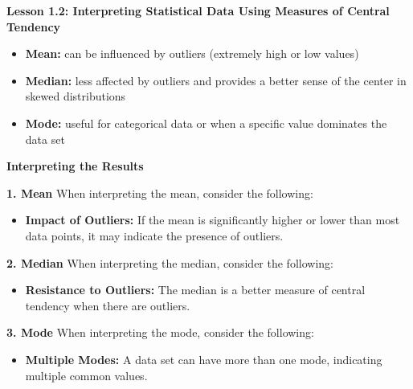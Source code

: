 \begin{center}
\textbf{Lesson 1.2: Interpreting Statistical Data Using Measures of Central Tendency}
\end{center}

\vspace*{1ex}

\begin{itemize}
    \item \textbf{Mean:} can be influenced by outliers (extremely high or low values)
    \item \textbf{Median:} less affected by outliers and provides a better sense of the center in skewed distributions
    \item \textbf{Mode:} useful for categorical data or when a specific value dominates the data set
\end{itemize}

\noindent\textbf{Interpreting the Results}

\noindent\textbf{1. Mean}
When interpreting the mean, consider the following:
\begin{itemize}
    \item \textbf{Impact of Outliers:} If the mean is significantly higher or lower than most data points, it may indicate the presence of outliers.
\end{itemize}

\noindent\textbf{2. Median}
When interpreting the median, consider the following:
\begin{itemize}
    \item \textbf{Resistance to Outliers:} The median is a better measure of central tendency when there are outliers.
\end{itemize}

\noindent\textbf{3. Mode}
When interpreting the mode, consider the following:
\begin{itemize}
    \item \textbf{Multiple Modes:} A data set can have more than one mode, indicating multiple common values.
\end{itemize}
